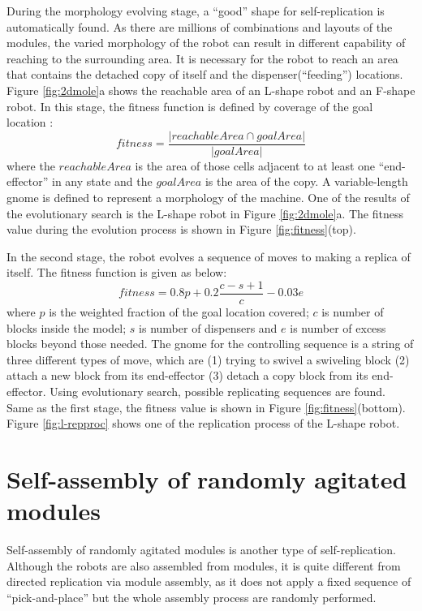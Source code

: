 \documentclass[12pt,twoside]{article}
\theoremstyle{plain}
\theoremstyle{definition}
\theoremstyle{remark}
\begin{document}
During the morphology evolving stage, a ``good'' shape for self-replication is automatically found. As there are millions of combinations and layouts of the modules, the varied morphology of the robot can result in different capability of reaching to the surrounding area. It is necessary for the robot to reach an area that contains the detached copy of itself and the dispenser(``feeding'') locations. Figure \ref{fig:2dmole}a shows the reachable area of an L-shape robot and an F-shape robot. In this stage, the fitness function is defined by coverage of the goal location :
\[ fitness = \frac{|reachableArea \cap goalArea|}{|goalArea|} \] where the $reachableArea$ is the area of those cells adjacent to at least one ``end-effector'' in any state and the $goalArea$ is the area of the copy. A variable-length gnome is defined to represent a morphology of the machine. One of the results of the evolutionary search is the L-shape robot in Figure \ref{fig:2dmole}a. The fitness value during the evolution process is shown in Figure \ref{fig:fitness}(top).

In the second stage, the robot evolves a sequence of moves to making a replica of itself. The fitness function is given as below: 
\[ fitness = 0.8p + 0.2 \frac{c - s + 1}{c} - 0.03 e \] 
where $p$ is the weighted fraction of the goal location covered; $c$ is number of blocks inside the model; $s$ is number of dispensers and $e$ is number of excess blocks beyond those needed. The gnome for the controlling sequence is a string of three different types of move, which are (1) trying to swivel a swiveling block (2) attach a new block from its end-effector (3) detach a copy block from its end-effector. Using evolutionary search, possible replicating sequences are found. Same as the first stage, the fitness value is shown in  Figure \ref{fig:fitness}(bottom). Figure \ref{fig:l-repproc} shows one of the replication process of the L-shape robot.

\section{Self-assembly of randomly agitated modules}
\label{sec:random}

Self-assembly of randomly agitated modules is another type of self-replication. Although the robots are also assembled from modules, it is quite different from directed replication via module assembly, as it does not apply a fixed sequence of ``pick-and-place'' but the whole assembly process are randomly performed.
\end{document}
